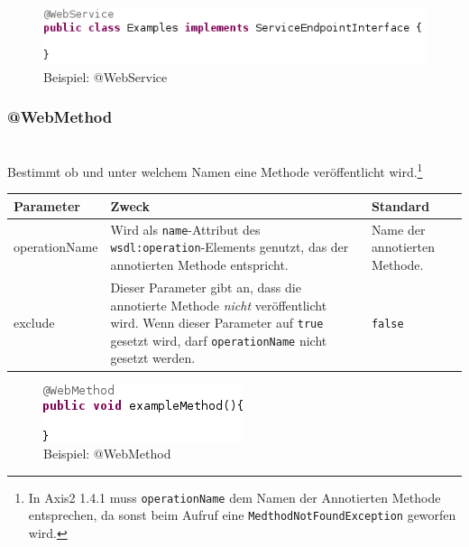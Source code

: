 \documentclass[runningheads]{llncs}
\newcommand{\anntabwidth}{\textwidth}
\begin{document}
    \begin{figure}[tbh]
      \centering
      \includegraphics[width=\textwidth]{../images/AtWebService.png}
      \caption{Beispiel: @WebService}
      \label{fig:ws}
    \end{figure} \vfill

    \subsubsection{@WebMethod}\ \\
      Bestimmt ob und unter welchem Namen eine Methode veröffentlicht wird.\footnote{In Axis2 1.4.1 muss \texttt{operationName} dem Namen der Annotierten Methode entsprechen, da sonst beim Aufruf eine \texttt{MedthodNotFoundException} geworfen wird.}\\
    \tymin=75pt
    \begin{tabulary}{\anntabwidth}{|l|L|L|}
    \hline
    \textbf{Parameter} & \textbf{Zweck} & \textbf{Standard} \\
    \hline
      operationName &
      Wird als \texttt{name}-Attribut des \texttt{wsdl:operation}-Elements genutzt, das der annotierten Methode entspricht. &
      Name der annotierten Methode. \\
    \hline
      exclude &
      Dieser Parameter gibt an, dass die annotierte Methode \emph{nicht} veröffentlicht wird. \newline Wenn dieser Parameter auf \texttt{true} gesetzt wird, darf \texttt{operationName} nicht gesetzt werden. &
      \texttt{false} \\
    \hline
    \end{tabulary} \vfill
    \tymin=10pt
    \begin{figure}[tbh]
      \centering
      \includegraphics{../images/AtWebMethod.png}
      \caption{Beispiel: @WebMethod}
      \label{fig:wm}
    \end{figure}
\end{document}
